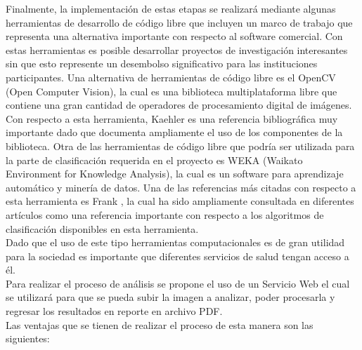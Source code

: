 \documentclass[12pt,letterpaper,titlepage]{article}
\begin{document}
\begin{itemize}
Finalmente, la implementación de estas etapas se realizará mediante algunas herramientas de desarrollo de código libre que incluyen un marco de trabajo que representa una alternativa importante con respecto al software comercial. Con estas herramientas es posible desarrollar proyectos de investigación interesantes sin que esto represente un desembolso significativo para las instituciones participantes. Una alternativa de herramientas de código libre es el OpenCV (Open Computer Vision), la cual es una biblioteca multiplataforma libre que contiene una gran cantidad de operadores de procesamiento digital de imágenes. Con respecto a esta herramienta,  Kaehler \cite{110} es una referencia bibliográfica muy importante dado que documenta ampliamente el uso de los componentes de la biblioteca. Otra de las herramientas de código libre que podría ser utilizada para la parte de clasificación requerida en el proyecto es WEKA (Waikato Environment for Knowledge Analysis), la cual es un software para aprendizaje automático y minería de datos. Una de las referencias más citadas con respecto a esta herramienta es Frank \cite{105}, la cual ha sido ampliamente consultada en diferentes artículos como una referencia importante con respecto a los algoritmos de clasificación disponibles en esta herramienta.\\

Dado que el uso de este tipo herramientas computacionales es de gran utilidad para la sociedad es importante que diferentes servicios de salud tengan acceso a él.\\

Para realizar el proceso de análisis se propone el uso de un Servicio Web el cual se utilizará para que se pueda subir la imagen a analizar, poder procesarla y regresar los resultados en reporte en archivo PDF.\\

Las ventajas que se tienen de realizar el proceso de esta manera son las siguientes:


\end{itemize}
\end{document}
